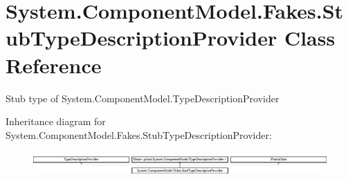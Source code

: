 \hypertarget{class_system_1_1_component_model_1_1_fakes_1_1_stub_type_description_provider}{\section{System.\-Component\-Model.\-Fakes.\-Stub\-Type\-Description\-Provider Class Reference}
\label{class_system_1_1_component_model_1_1_fakes_1_1_stub_type_description_provider}
}


Stub type of System.\-Component\-Model.\-Type\-Description\-Provider 


Inheritance diagram for System.\-Component\-Model.\-Fakes.\-Stub\-Type\-Description\-Provider\-:\begin{figure}[H]
\begin{center}
\leavevmode
\includegraphics[height=0.940386cm]{class_system_1_1_component_model_1_1_fakes_1_1_stub_type_description_provider}
\end{center}
\end{figure}
